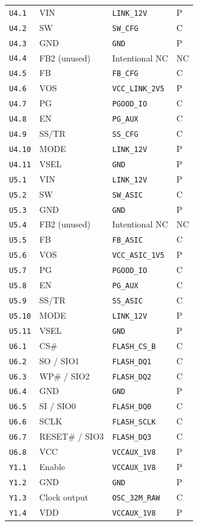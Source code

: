 \documentclass[11pt,a4paper]{article}
\begin{document}
\begin{longtable}{@{}P{25mm}P{59mm}P{73mm}P{9mm}@{}}
\nolinkurl{U4.1} & VIN & \nolinkurl{LINK_12V} & P \\
\nolinkurl{U4.2} & SW & \nolinkurl{SW_CFG} & C \\
\nolinkurl{U4.3} & GND & \nolinkurl{GND} & P \\
\nolinkurl{U4.4} & FB2 (unused) & Intentional NC & NC \\
\nolinkurl{U4.5} & FB & \nolinkurl{FB_CFG} & C \\
\nolinkurl{U4.6} & VOS & \nolinkurl{VCC_LINK_2V5} & P \\
\nolinkurl{U4.7} & PG & \nolinkurl{PGOOD_IO} & C \\
\nolinkurl{U4.8} & EN & \nolinkurl{PG_AUX} & C \\
\nolinkurl{U4.9} & SS/TR & \nolinkurl{SS_CFG} & C \\
\nolinkurl{U4.10} & MODE & \nolinkurl{LINK_12V} & P \\
\nolinkurl{U4.11} & VSEL & \nolinkurl{GND} & P \\
\nolinkurl{U5.1} & VIN & \nolinkurl{LINK_12V} & P \\
\nolinkurl{U5.2} & SW & \nolinkurl{SW_ASIC} & C \\
\nolinkurl{U5.3} & GND & \nolinkurl{GND} & P \\
\nolinkurl{U5.4} & FB2 (unused) & Intentional NC & NC \\
\nolinkurl{U5.5} & FB & \nolinkurl{FB_ASIC} & C \\
\nolinkurl{U5.6} & VOS & \nolinkurl{VCC_ASIC_1V5} & P \\
\nolinkurl{U5.7} & PG & \nolinkurl{PGOOD_IO} & C \\
\nolinkurl{U5.8} & EN & \nolinkurl{PG_AUX} & C \\
\nolinkurl{U5.9} & SS/TR & \nolinkurl{SS_ASIC} & C \\
\nolinkurl{U5.10} & MODE & \nolinkurl{LINK_12V} & P \\
\nolinkurl{U5.11} & VSEL & \nolinkurl{GND} & P \\
\nolinkurl{U6.1} & CS\# & \nolinkurl{FLASH_CS_B} & C \\
\nolinkurl{U6.2} & SO / SIO1 & \nolinkurl{FLASH_DQ1} & C \\
\nolinkurl{U6.3} & WP\# / SIO2 & \nolinkurl{FLASH_DQ2} & C \\
\nolinkurl{U6.4} & GND & \nolinkurl{GND} & P \\
\nolinkurl{U6.5} & SI / SIO0 & \nolinkurl{FLASH_DQ0} & C \\
\nolinkurl{U6.6} & SCLK & \nolinkurl{FLASH_SCLK} & C \\
\nolinkurl{U6.7} & RESET\# / SIO3 & \nolinkurl{FLASH_DQ3} & C \\
\nolinkurl{U6.8} & VCC & \nolinkurl{VCCAUX_1V8} & P \\
\nolinkurl{Y1.1} & Enable & \nolinkurl{VCCAUX_1V8} & P \\
\nolinkurl{Y1.2} & GND & \nolinkurl{GND} & P \\
\nolinkurl{Y1.3} & Clock output & \nolinkurl{OSC_32M_RAW} & C \\
\nolinkurl{Y1.4} & VDD & \nolinkurl{VCCAUX_1V8} & P \\
\end{longtable}\endgroup
\end{document}
